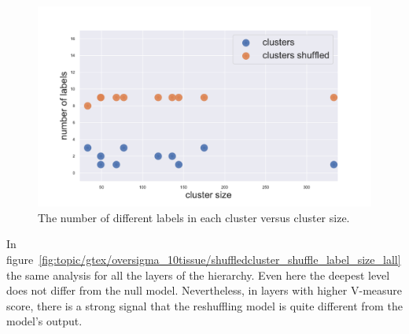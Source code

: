 \begin{figure}[htb!]
    \centering
    \includegraphics[width=0.9\linewidth]{pictures/topic/gtex/oversigma_10tissue/shuffledcluster_shuffle_label_size_l3_primary_site.pdf}
    \caption{The number of different labels in each cluster versus cluster size.}
    \label{fig:topic/gtex/oversigma_10tissue/shuffledcluster_shuffle_label_size_l3_primary_site}
\end{figure}
In figure~\ref{fig:topic/gtex/oversigma_10tissue/shuffledcluster_shuffle_label_size_lall} the same analysis for all the layers of the hierarchy. Even here the deepest level does not differ from the null model. Nevertheless, in layers with higher V-measure score, there is a strong signal that the reshuffling model is quite different from the model's output.
